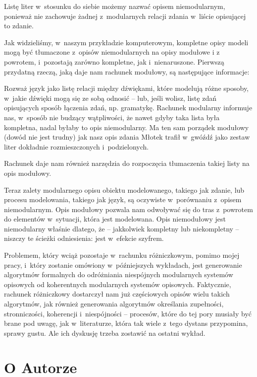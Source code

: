 \documentclass[oneside,polish,11pt,rmheadings]{mwbk}
\begin{document}
Listę liter w~stosunku do siebie możemy nazwać opisem niemodularnym, ponieważ nie zachowuje żadnej z~modularnych relacji zdania w~liście opisującej to zdanie. 

Jak widzieliśmy, w~naszym przykładzie komputerowym, kompletne opisy modeli mogą być tłumaczone z~opisów niemodularnych na opisy modułowe i z powrotem, i~pozostają zarówno kompletne, jak i~nienaruszone. Pierwszą przydatną rzeczą, jaką daje nam rachunek modułowy, są następujące informacje: 

Rozważ język jako listę relacji między dźwiękami, które modelują różne sposoby, w~jakie dźwięki mogą się ze sobą odnosić -- lub, jeśli wolisz, listę zdań opisujących sposób łączenia zdań, np. gramatykę. Rachunek modularny informuje nas, w~sposób nie budzący wątpliwości, że nawet gdyby taka lista była kompletna, nadal byłaby to opis niemodularny. Ma ten sam porządek modułowy (dowód nie jest trudny) jak nasz opis zdania Młotek trafił w~gwóźdź jako zestaw liter dokładnie rozmieszczonych i~podzielonych. 

Rachunek daje nam również narzędzia do rozpoczęcia tłumaczenia takiej listy na opis modułowy. 

Teraz zalety modularnego opisu obiektu modelowanego, takiego jak zdanie, lub procesu modelowania, takiego jak język, są oczywiste w~porównaniu z~opisem niemodularnym. Opis modułowy pozwala nam odwoływać się do tras z~powrotem do elementów w~sytuacji, która jest modelowana. Opis niemodułowy jest niemodularny właśnie dlatego, że -- jakkolwiek kompletny lub niekompletny -- niszczy te ścieżki odniesienia: jest w~efekcie szyfrem. 

Problemem, który wciąż pozostaje w~rachunku różniczkowym, pomimo mojej pracy, i~który zostanie omówiony w~późniejszych wykładach, jest generowanie algorytmów formalnych do odróżniania niespójnych modularnych systemów opisowych od koherentnych modularnych systemów opisowych. Faktycznie, rachunek różniczkowy dostarczył nam już częściowych opisów wielu takich algorytmów, jak również generowania algorytmów określania zupełności, stronniczości, koherencji i~niespójności -- procesów, które do tej pory musiały być brane pod uwagę, jak w~literaturze, która tak wiele z~tego dystans przypomina, sprawy gustu. Ale ich dyskusję trzeba zostawić na ostatni wykład. 

\chapter*{O Autorze} 
\end{document}
